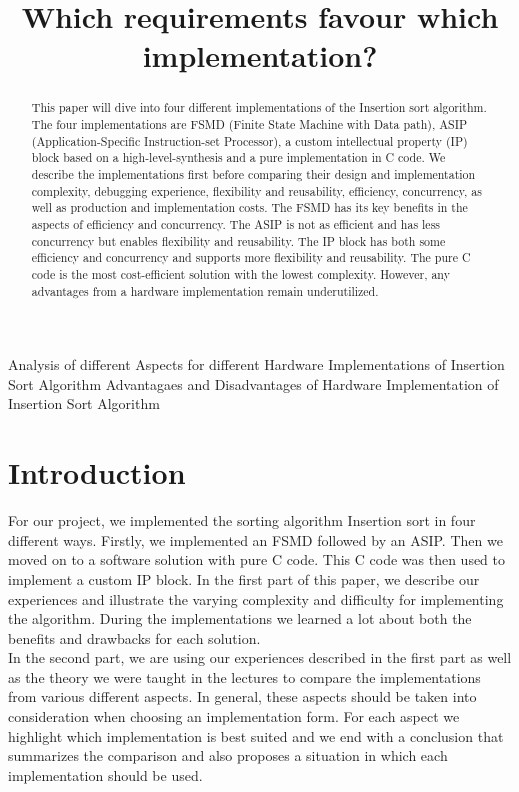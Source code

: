 \documentclass[conference]{IEEEtran}
\begin{document}
\title{Which requirements favour which implementation? \\}
Analysis of different Aspects for different Hardware Implementations of Insertion Sort Algorithm
Advantagaes and Disadvantages of Hardware Implementation of Insertion Sort Algorithm



\author{
\and
{}
\and
{}
}
\maketitle

\begin{abstract}
This paper will dive into four different implementations of the Insertion sort algorithm. The four implementations are FSMD (Finite State Machine with Data path), ASIP (Application-Specific Instruction-set Processor), a custom intellectual property (IP) block based on a high-level-synthesis and a pure implementation in C code. We describe the implementations first before comparing their design and implementation complexity, debugging experience, flexibility and reusability, efficiency, concurrency, as well as production and implementation costs. The FSMD has its key benefits in the aspects of efficiency and concurrency. The ASIP is not as efficient and has less concurrency but enables flexibility and reusability. The IP block has both some efficiency and concurrency and supports more flexibility and reusability. The pure C code is the most cost-efficient solution with the lowest complexity. However, any advantages from a hardware implementation remain underutilized.
\end{abstract}

\section{Introduction}
For our project, we implemented the sorting algorithm Insertion sort in four different ways. Firstly, we implemented an FSMD followed by an ASIP. Then we moved on to a software solution with pure C code. This C code was then used to implement a custom IP block. In the first part of this paper, we describe our experiences and illustrate the varying complexity and difficulty for implementing the algorithm. During the implementations we learned a lot about both the benefits and drawbacks for each solution.\\
In the second part, we are using our experiences described in the first part as well as the theory we were taught in the lectures to compare the implementations from various different aspects. In general, these aspects should be taken into consideration when choosing an implementation form. For each aspect we highlight which implementation is best suited and we end with a conclusion that summarizes the comparison and also proposes a situation in which each implementation should be used.
\end{document}
